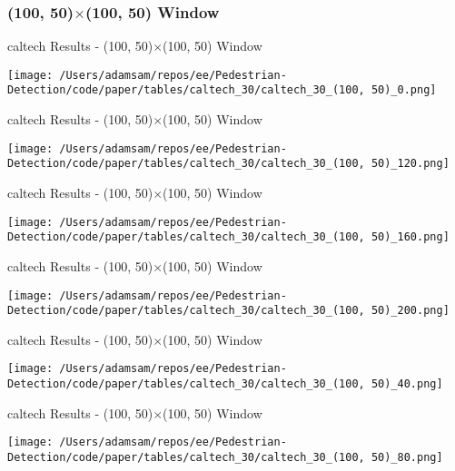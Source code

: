 
\subsubsection*{(100, 50)$\times$(100, 50) Window}

\begin{table}
    \caption{caltech Results - (100, 50)$\times$(100, 50) Window}
    \texttt{[image: /Users/adamsam/repos/ee/Pedestrian-Detection/code/paper/tables/caltech\_30/caltech\_30\_(100, 50)\_0.png]}
    \label{tab:caltech_30_(100, 50)_0}
\end{table}

\begin{table}
    \caption{caltech Results - (100, 50)$\times$(100, 50) Window}
    \texttt{[image: /Users/adamsam/repos/ee/Pedestrian-Detection/code/paper/tables/caltech\_30/caltech\_30\_(100, 50)\_120.png]}
    \label{tab:caltech_30_(100, 50)_120}
\end{table}

\begin{table}
    \caption{caltech Results - (100, 50)$\times$(100, 50) Window}
    \texttt{[image: /Users/adamsam/repos/ee/Pedestrian-Detection/code/paper/tables/caltech\_30/caltech\_30\_(100, 50)\_160.png]}
    \label{tab:caltech_30_(100, 50)_160}
\end{table}

\begin{table}
    \caption{caltech Results - (100, 50)$\times$(100, 50) Window}
    \texttt{[image: /Users/adamsam/repos/ee/Pedestrian-Detection/code/paper/tables/caltech\_30/caltech\_30\_(100, 50)\_200.png]}
    \label{tab:caltech_30_(100, 50)_200}
\end{table}

\begin{table}
    \caption{caltech Results - (100, 50)$\times$(100, 50) Window}
    \texttt{[image: /Users/adamsam/repos/ee/Pedestrian-Detection/code/paper/tables/caltech\_30/caltech\_30\_(100, 50)\_40.png]}
    \label{tab:caltech_30_(100, 50)_40}
\end{table}

\begin{table}
    \caption{caltech Results - (100, 50)$\times$(100, 50) Window}
    \texttt{[image: /Users/adamsam/repos/ee/Pedestrian-Detection/code/paper/tables/caltech\_30/caltech\_30\_(100, 50)\_80.png]}
    \label{tab:caltech_30_(100, 50)_80}
\end{table}

